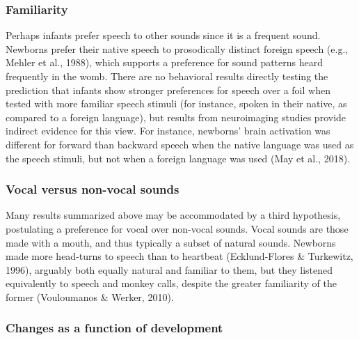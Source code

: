 \documentclass[man]{apa6}
\begin{document}
\subsubsection{Familiarity}\label{familiarity}

Perhaps infants prefer speech to other sounds since it is a frequent
sound. Newborns prefer their native speech to prosodically distinct
foreign speech (e.g., Mehler et al., 1988), which supports a preference
for sound patterns heard frequently in the womb. There are no behavioral
results directly testing the prediction that infants show stronger
preferences for speech over a foil when tested with more familiar speech
stimuli (for instance, spoken in their native, as compared to a foreign
language), but results from neuroimaging studies provide indirect
evidence for this view. For instance, newborns' brain activation was
different for forward than backward speech when the native language was
used as the speech stimuli, but not when a foreign language was used
(May et al., 2018).

\subsubsection{Vocal versus non-vocal
sounds}\label{vocal-versus-non-vocal-sounds}

Many results summarized above may be accommodated by a third hypothesis,
postulating a preference for vocal over non-vocal sounds. Vocal sounds
are those made with a mouth, and thus typically a subset of natural
sounds. Newborns made more head-turns to speech than to heartbeat
(Ecklund-Flores \& Turkewitz, 1996), arguably both equally natural and
familiar to them, but they listened equivalently to speech and monkey
calls, despite the greater familiarity of the former (Vouloumanos \&
Werker, 2010).

\subsubsection{Changes as a function of
development}\label{changes-as-a-function-of-development}
\end{document}
